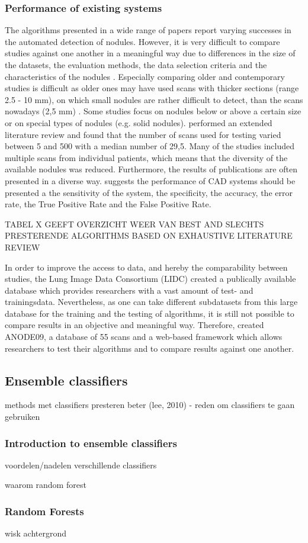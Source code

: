 \subsubsection{Performance of existing systems}
 The algorithms presented in a wide range of papers report varying
 successes in the automated detection of nodules. However, it is very difficult
 to compare studies against one another in a meaningful way due to differences
 in the size of the datasets, the evaluation methods, the data selection
 criteria and the characteristics of the nodules \cite{lee2010}. Especially
 comparing older and contemporary studies is difficult as older ones may have
 used scans with thicker sections (range 2.5 - 10 mm), on which small nodules
 are rather difficult to detect, than the scans nowadays (2,5 mm) \cite{lee2010,
 ginneken} \cite{mur}. Some studies focus on nodules below or above a certain
 size or on special types of nodules (e.g. solid nodules). \cite{mur} performed an extended
 literature review and found that the number of scans used for testing varied between 5 and 500 with a
 median number of 29,5. Many of the studies included multiple scans from
 individual patients, which means that the diversity of the available nodules
 was reduced. Furthermore, the results of publications are often presented in a
 diverse way. \cite{results} suggests the performance of CAD systems should be
 presented a the sensitivity of the system, the specificity, the accuracy, the
 error rate, the True Positive Rate and the False Positive Rate.
 
 TABEL X GEEFT OVERZICHT WEER VAN BEST AND SLECHTS PRESTERENDE ALGORITHMS BASED
 ON EXHAUSTIVE LITERATURE REVIEW
 
 In order to improve the access to data, and hereby the comparability between
 studies, the Lung Image Data Consortium (LIDC) created a publically available
 database which provides researchers with a vast amount of test- and
 trainingsdata. Nevertheless, as one can take different subdatasets from this
 large database for the training and the testing of algorithms, it is still not
 possible to compare results in an objective and meaningful way. Therefore,
 \cite{ginneken} created ANODE09, a database of 55 scans and a web-based
 framework which allows researchers to test their algorithms and to
 compare results against one another.
 
\subsection{Ensemble classifiers}
 methods met classifiers presteren beter (lee, 2010)
- reden om classifiers te gaan gebruiken

\subsubsection{Introduction to ensemble classifiers}
voordelen/nadelen verschillende classifiers

waarom random forest

\subsubsection{Random Forests}
wisk achtergrond







